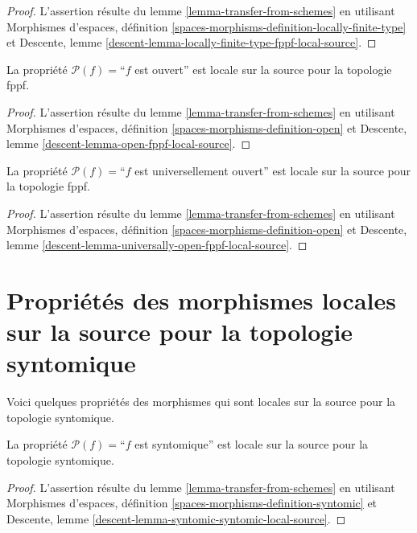 \begin{proof}
L'assertion résulte du
lemme \ref{lemma-transfer-from-schemes}
en utilisant
Morphismes d'espaces,
définition \ref{spaces-morphisms-definition-locally-finite-type}
et
Descente, lemme \ref{descent-lemma-locally-finite-type-fppf-local-source}.
\end{proof}

\begin{lemma}
\label{lemma-open-fppf-local-source}
La propriété $\mathcal{P}(f)=$``$f$ est ouvert''
est locale sur la source pour la topologie fppf.
\end{lemma}

\begin{proof}
L'assertion résulte du
lemme \ref{lemma-transfer-from-schemes}
en utilisant
Morphismes d'espaces, définition \ref{spaces-morphisms-definition-open}
et
Descente, lemme \ref{descent-lemma-open-fppf-local-source}.
\end{proof}

\begin{lemma}
\label{lemma-universally-open-fppf-local-source}
La propriété $\mathcal{P}(f)=$``$f$ est universellement ouvert''
est locale sur la source pour la topologie fppf.
\end{lemma}

\begin{proof}
L'assertion résulte du
lemme \ref{lemma-transfer-from-schemes}
en utilisant
Morphismes d'espaces, définition \ref{spaces-morphisms-definition-open}
et
Descente, lemme \ref{descent-lemma-universally-open-fppf-local-source}.
\end{proof}



\section{Propriétés des morphismes locales sur la source pour la topologie syntomique}
\label{section-syntomic-local-source}

\noindent
Voici quelques propriétés des morphismes qui sont locales sur la source pour la topologie syntomique.

\begin{lemma}
\label{lemma-syntomic-syntomic-local-source}
La propriété $\mathcal{P}(f)=$``$f$ est syntomique''
est locale sur la source pour la topologie syntomique.
\end{lemma}

\begin{proof}
L'assertion résulte du
lemme \ref{lemma-transfer-from-schemes}
en utilisant
Morphismes d'espaces, définition \ref{spaces-morphisms-definition-syntomic}
et
Descente, lemme \ref{descent-lemma-syntomic-syntomic-local-source}.
\end{proof}




